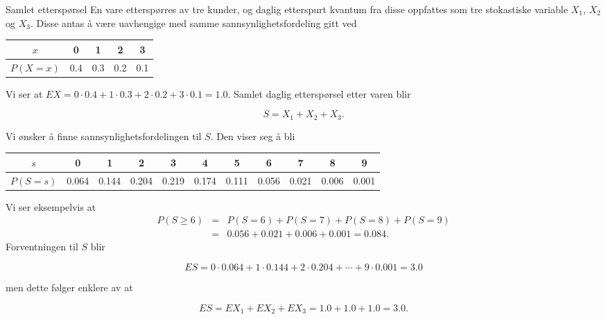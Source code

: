 \begin{eksempel}{Samlet etterspørsel}
En vare etterspørres av tre kunder, og daglig etterspurt kvantum
fra disse oppfattes som tre stokastiske variable $X_1$, $X_2$ og
$X_3$. Disse antas å være uavhengige med samme
sannsynlighetsfordeling gitt ved
\begin{center}
 \begin{tabular}{c|cccc}
 $x$& 0  & 1 & 2 & 3 \\ \hline
 $P(X=x)$ & 0.4 & 0.3 & 0.2 & 0.1
\end{tabular}
\end{center}
\noindent Vi ser at $EX=0\cdot 0.4+1\cdot 0.3+2\cdot 0.2+3\cdot 0.1=1.0$.
Samlet daglig etterspørsel etter varen blir

\[ S=X_1+X_2+X_3. \]

\noindent Vi ønsker å finne sannsynlighetsfordelingen til $S$. Den viser
seg å bli
\begin{center} \small \addtolength{\tabcolsep}{-0.4\tabcolsep}
 \begin{tabular}{c|cccccccccc}
 $s$& 0  & 1 & 2 & 3 & 4 & 5 & 6 & 7 & 8 & 9 \\ \hline
 $P(S=s)$ &0.064&0.144&0.204&0.219&0.174&0.111&0.056&0.021&0.006&0.001
\end{tabular}
\end{center}
\noindent Vi ser eksempelvis at
\begin{eqnarray*}
    P(S\geq 6)&=&P(S=6)+P(S=7)+P(S=8)+P(S=9) \\
              &=&0.056+0.021+0.006+0.001=0.084.
\end{eqnarray*}
\noindent Forventningen til $S$ blir

\[ ES=0\cdot 0.064+1\cdot 0.144+2\cdot 0.204+\cdots +9\cdot 0.001=3.0 \]

\noindent men dette følger enklere av at

\[ ES=EX_1+EX_2+EX_3=1.0+1.0+1.0=3.0. \]


\end{eksempel}
